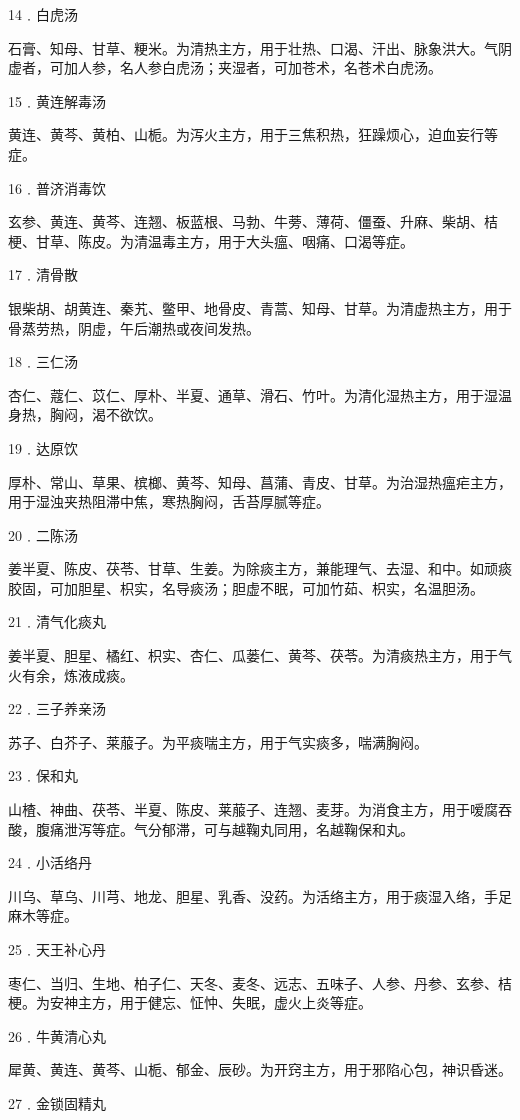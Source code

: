 \documentclass[12pt,UTF8]{ctexbook}
\begin{document}
14﹒白虎汤

石膏、知母、甘草、粳米。为清热主方，用于壮热、口渴、汗出、脉象洪大。气阴虚者，可加人参，名人参白虎汤；夹湿者，可加苍术，名苍术白虎汤。

15﹒黄连解毒汤

黄连、黄芩、黄柏、山栀。为泻火主方，用于三焦积热，狂躁烦心，迫血妄行等症。

16﹒普济消毒饮

玄参、黄连、黄芩、连翘、板蓝根、马勃、牛蒡、薄荷、僵蚕、升麻、柴胡、桔梗、甘草、陈皮。为清温毒主方，用于大头瘟、咽痛、口渴等症。

17﹒清骨散

银柴胡、胡黄连、秦艽、鳖甲、地骨皮、青蒿、知母、甘草。为清虚热主方，用于骨蒸劳热，阴虚，午后潮热或夜间发热。

18﹒三仁汤

杏仁、蔻仁、苡仁、厚朴、半夏、通草、滑石、竹叶。为清化湿热主方，用于湿温身热，胸闷，渴不欲饮。

19﹒达原饮

厚朴、常山、草果、槟榔、黄芩、知母、菖蒲、青皮、甘草。为治湿热瘟疟主方，用于湿浊夹热阻滞中焦，寒热胸闷，舌苔厚腻等症。

20﹒二陈汤

姜半夏、陈皮、茯苓、甘草、生姜。为除痰主方，兼能理气、去湿、和中。如顽痰胶固，可加胆星、枳实，名导痰汤；胆虚不眠，可加竹茹、枳实，名温胆汤。

21﹒清气化痰丸

姜半夏、胆星、橘红、枳实、杏仁、瓜蒌仁、黄芩、茯苓。为清痰热主方，用于气火有余，炼液成痰。

22﹒三子养亲汤

苏子、白芥子、莱菔子。为平痰喘主方，用于气实痰多，喘满胸闷。

23﹒保和丸

山楂、神曲、茯苓、半夏、陈皮、莱菔子、连翘、麦芽。为消食主方，用于嗳腐吞酸，腹痛泄泻等症。气分郁滞，可与越鞠丸同用，名越鞠保和丸。

24﹒小活络丹

川乌、草乌、川芎、地龙、胆星、乳香、没药。为活络主方，用于痰湿入络，手足麻木等症。

25﹒天王补心丹

枣仁、当归、生地、柏子仁、天冬、麦冬、远志、五味子、人参、丹参、玄参、桔梗。为安神主方，用于健忘、怔忡、失眠，虚火上炎等症。

26﹒牛黄清心丸

犀黄、黄连、黄芩、山栀、郁金、辰砂。为开窍主方，用于邪陷心包，神识昏迷。

27﹒金锁固精丸
\end{document}
